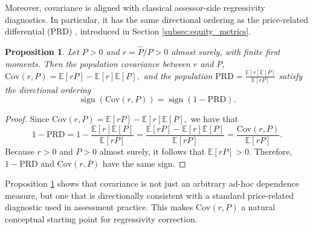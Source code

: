 \documentclass[12pt, draft]{article}
\theoremstyle{plain}
\newtheorem{proposition}{Proposition}
\theoremstyle{definition}
\newcommand{\1}{\mathbf{1}}
\newcommand{\Cov}{\text{Cov}}
\newcommand{\Expected}[1]{\mathbb{E}[#1]}
\begin{document}
{Moreover, covariance is aligned with classical assessor-side regressivity diagnostics. In particular, it has the same directional ordering as the price-related differential (PRD) \cite{IAAO2025ExposureRatio}, introduced in Section \ref{subsec:equity_metrics}.

\begin{proposition}
\label{prop:cov_prd}
Let $P>0$ and $r=\widehat P/P>0$ almost surely, with finite first moments. Then the population covariance between $r$ and $P$, $\Cov(r,P)=\Expected{rP}-\Expected{r}\Expected{P},$ and the population $
\mathrm{PRD}=\frac{\Expected{r}\Expected{P}}{\Expected{rP}}$
satisfy the directional ordering
\begin{equation}
\label{eq:cov_prd_sign}
\operatorname{sign}\!\left(\Cov(r,P)\right)
=
\operatorname{sign}\!\left(1-\mathrm{PRD}\right).
\end{equation}
\end{proposition}

\begin{proof}
Since
$
\Cov(r,P)=\Expected{rP}-\Expected{r}\Expected{P},
$
we have that
\[
1-\mathrm{PRD}
=
1-\frac{\Expected{r}\Expected{P}}{\Expected{rP}}
=
\frac{\Expected{rP}-\Expected{r}\Expected{P}}{\Expected{rP}}
=
\frac{\Cov(r,P)}{\Expected{rP}}.
\]
Because $r>0$ and $P>0$ almost surely, it follows that $\Expected{rP}>0$. Therefore, $1-\mathrm{PRD}$ and $\Cov(r,P)$ have the same sign.
\end{proof}


\noindent Proposition \ref{prop:cov_prd} shows that covariance is not just an arbitrary ad-hoc dependence measure, but one that is directionally consistent with a standard price-related diagnostic used in assessment practice. This makes $\Cov(r,P)$ a natural conceptual starting point for regressivity correction.

}
\end{document}
